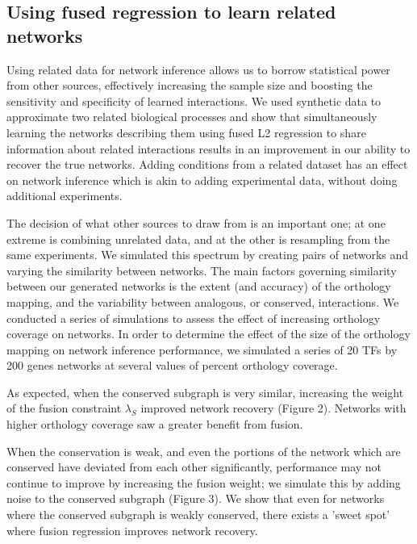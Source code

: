 \documentclass[11pt]{article}
\begin{document}
\subsection{Using fused regression to learn related networks}
Using related data for network inference allows us to borrow statistical power from other sources, effectively increasing the sample size and boosting the sensitivity and specificity of learned interactions. We used synthetic data to approximate two related biological processes and show that simultaneously learning the networks describing them using fused L2 regression to share information about related interactions results in an improvement in our ability to recover the true networks. Adding conditions from a related dataset has an effect on network inference which is akin to adding experimental data, without doing additional experiments.  

The decision of what other sources to draw from is an important one; at one extreme is combining unrelated data, and at the other is resampling from the same experiments. We simulated this spectrum by creating pairs of networks and varying the similarity between networks. The main factors governing similarity between our generated networks is the extent (and accuracy) of the orthology mapping, and the variability between analogous, or conserved, interactions. We conducted a series of simulations to assess the effect of increasing orthology coverage on networks. In order to determine the effect of the size of the orthology mapping on network inference performance, we simulated a series of 20 TFs by 200 genes networks at several values of percent orthology coverage. 

As expected, when the conserved subgraph is very similar, increasing the weight of the fusion constraint $\lambda_S$ improved network recovery (Figure 2). Networks with higher orthology coverage saw a greater benefit from fusion.

When the conservation is weak, and even the portions of the network which are conserved have deviated from each other significantly, performance may not continue to improve by increasing the fusion weight; we simulate this by adding noise to the conserved subgraph (Figure 3). We show that even for networks where the conserved subgraph is weakly conserved, there exists a 'sweet spot' where fusion regression improves network recovery. 
\end{document}
